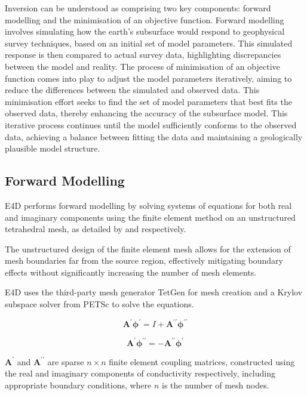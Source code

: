 \documentclass[a4paper,12pt]{article}
\begin{document}
Inversion can be understood as comprising two key components: forward modelling and the minimisation of an objective function. Forward modelling involves simulating how the earth's subsurface would respond to geophysical survey techniques, based on an initial set of model parameters. This simulated response is then compared to actual survey data, highlighting discrepancies between the model and reality. The process of minimisation of an objective function comes into play to adjust the model parameters iteratively, aiming to reduce the differences between the simulated and observed data. This minimisation effort seeks to find the set of model parameters that best fits the observed data, thereby enhancing the accuracy of the subsurface model. This iterative process continues until the model sufficiently conforms to the observed data, achieving a balance between fitting the data and maintaining a geologically plausible model structure.

\subsection{Forward Modelling}

E4D performs forward modelling by solving systems of equations for both real and imaginary components using the finite element method on an unstructured tetrahedral mesh, as detailed by \cite{johnson_3-d_2017} and \cite{rucker_three-dimensional_2006} respectively.

The unstructured design of the finite element mesh allows for the extension of mesh boundaries far from the source region, effectively mitigating boundary effects without significantly increasing the number of mesh elements.

E4D uses the third-party mesh generator TetGen \cite{10.1145/2629697} for mesh creation and a Krylov subspace solver from PETSc \cite{balay2019petsc} to solve the equations.

\begin{equation}
\mathbf{A}^\prime \boldsymbol {\phi}^\prime = I + \mathbf{A}^{\prime\prime}\boldsymbol {\phi}^{\prime\prime}
\end{equation}

\begin{equation}
\mathbf{A}^\prime \boldsymbol {\phi}^{\prime\prime} = -\mathbf{A}^{\prime\prime}\boldsymbol {\phi}^\prime
\end{equation}

$\mathbf{A}^\prime$ and $\mathbf{A}^{\prime\prime}$ are sparse $n \times n$ finite element coupling matrices, constructed using the real and imaginary components of conductivity respectively, including appropriate boundary conditions, where $n$ is the number of mesh nodes.
\end{document}
